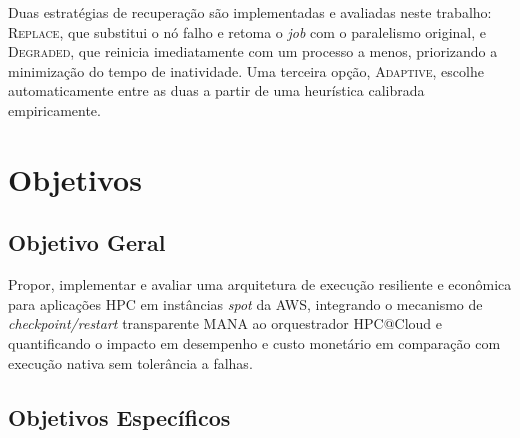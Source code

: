 Duas estratégias de recuperação são implementadas e avaliadas neste
trabalho: \textsc{Replace}, que substitui o nó falho e retoma o \textit{job} com o paralelismo
original, e \textsc{Degraded}, que reinicia imediatamente com um processo a menos,
priorizando a minimização do tempo de inatividade. Uma terceira opção,
\textsc{Adaptive}, escolhe automaticamente entre as duas a partir de uma
heurística calibrada empiricamente.


\section{Objetivos}
\label{sec:objetivos}

\subsection{Objetivo Geral}
\label{sec:objetivo-geral}

Propor, implementar e avaliar uma arquitetura de execução resiliente e econômica para
aplicações HPC em instâncias \textit{spot} da AWS, integrando o mecanismo de
\textit{checkpoint/restart} transparente MANA ao orquestrador HPC@Cloud e
quantificando o impacto em desempenho e custo monetário em comparação com execução
nativa sem tolerância a falhas.


\subsection{Objetivos Específicos}
\label{sec:objetivos-especificos}

